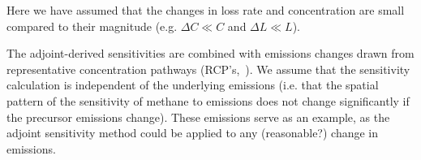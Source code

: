 Here we have assumed that the changes in loss rate and concentration are small compared to their magnitude (e.g. $\Delta C \ll C$ and $\Delta L \ll L$).

The adjoint-derived sensitivities are combined with emissions changes drawn from representative concentration pathways (RCP's,~\citet{ref:lamarque2011,ref:vanvuuren2011}). We assume that the sensitivity calculation is independent of the underlying emissions (i.e. that the spatial pattern of the sensitivity of methane to emissions does not change significantly if the precursor emissions change). These emissions serve as an example, as the adjoint sensitivity method could be applied to any (reasonable?) change in emissions.